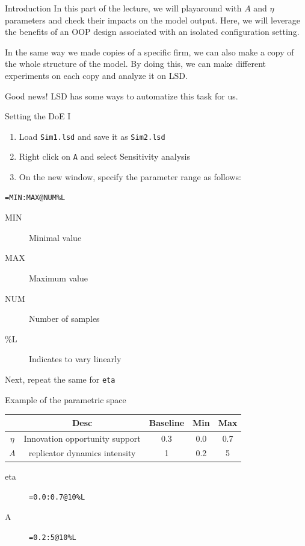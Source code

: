 \documentclass[bigger,aspectratio=169]{beamer}
\begin{document}
\begin{frame}[label={sec:orgb1269ad}]{Introduction}
In this part of the lecture, we will playaround with \(A\) and \(\eta\) parameters and check their impacts on the model output.
Here, we will leverage the benefits of an OOP design associated with an isolated configuration setting.

In the same way we made copies of a specific firm, we can also make a copy of the whole structure of the model.
By doing this, we can make different experiments on each copy and analyze it on LSD.
\begin{block}{Good news!}
LSD has some ways to automatize this task for us.
\end{block}
\end{frame}
\begin{frame}[label={sec:org1a91fa2},fragile]{Setting the DoE I}
 \begin{enumerate}
\item Load \texttt{Sim1.lsd} and save it as \texttt{Sim2.lsd}
\item Right click on \texttt{A} and select \alert{Sensitivity analysis}
\item On the new window, specify the parameter range as follows:
\end{enumerate}

\begin{verbatim}
=MIN:MAX@NUM%L
\end{verbatim}

\begin{description}
\item[{MIN}] Minimal value
\item[{MAX}] Maximum value
\item[{NUM}] Number of samples
\item[{\%L}] Indicates to vary linearly
\end{description}

Next, repeat the same for \texttt{eta}
\end{frame}
\begin{frame}[label={sec:org74cb95b},fragile]{Example of the parametric space}
 \begin{center}
\begin{tabular}{ccccc}
\hline
 & Desc & Baseline & Min & Max\\
\hline
\(\eta\) & Innovation opportunity support & 0.3 & 0.0 & 0.7\\
\(A\) & replicator dynamics intensity & 1 & 0.2 & 5\\
\hline
\end{tabular}
\end{center}
\begin{description}
\item[{eta}] \texttt{=0.0:0.7@10\%L}
\item[{A}] \texttt{=0.2:5@10\%L}
\end{description}
\end{frame}
\end{document}
